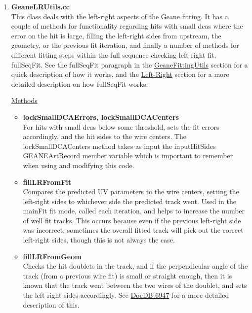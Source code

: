 \begin{enumerate}
      \item{\bf{GeaneLRUtils.cc}} \\
      \label{sec:GeaneLRUtils}
      This class deals with the left-right aspects of the Geane fitting. It has a couple of methods for functionality regarding hits with small dcas where the error on the hit is large, filling the left-right sides from upstream, the geometry, or the previous fit iteration, and finally a number of methods for different fitting steps within the full sequence checking left-right fit, fullSeqFit. See the fullSeqFit paragraph in the \hyperref[sec:GeaneFittingUtils]{GeaneFittingUtils} section for a quick description of how it works, and the \hyperref[sec:LR]{Left-Right} section for a more detailed description on how fullSeqFit works.

      \underline{Methods}

        \begin{itemize}

          \item{\bf{lockSmallDCAErrors, lockSmallDCACenters}} \\
          For hits with small dcas below some threshold, sets the fit errors accordingly, and the hit sides to the wire centers. The lockSmallDCACenters method takes as input the inputHitSides GEANEArtRecord member variable which is important to remember when using and modifying this code.

          \item{\bf{fillLRFromFit}} \\ 
          Compares the predicted UV parameters to the wire centers, setting the left-right sides to whichever side the predicted track went. Used in the mainFit fit mode, called each iteration, and helps to increase the number of well fit tracks. This occurs because even if the previous left-right side was incorrect, sometimes the overall fitted track will pick out the correct left-right sides, though this is not always the case.

          \item{\bf{fillLRFromGeom}} \\
          Checks the hit doublets in the track, and if the perpendicular angle of the track (from a previous wire fit) is small or straight enough, then it is known that the track went between the two wires of the doublet, and sets the left-right sides accordingly. See \href{https://gm2-docdb.fnal.gov/cgi-bin/private/ShowDocument?docid=6947}{DocDB 6947} for a more detailed description of this.


\end{itemize}
\end{enumerate}
